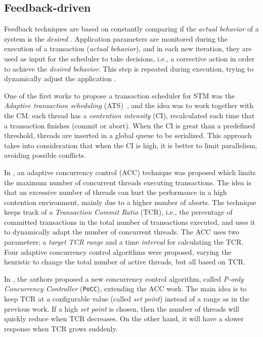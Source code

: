 \subsection{Feedback-driven}\label{sec:feedback}

Feedback techniques are based on constantly comparing if the \emph{actual behavior} of a system is the \emph{desired} \cite{Janert:2013}. Application parameters are monitored during the execution of a transaction (\emph{actual behavior}), and in each new iteration, they are used as input for the scheduler to take decisions, i.e., a corrective action in order to achieve the \emph{desired behavior}. This step is repeated during execution, trying to dynamically adjust the application \cite{Sanzo:2017}.

One of the first works to propose a transaction scheduler for  STM was the \textit{Adaptive transaction scheduling} (ATS)~\cite{Yoo:2008}, and the idea was to work together with the CM: each thread has a \emph{contention intensity} (CI), recalculated each time that a transaction finishes (commit or abort). When the CI is great than a predefined threshold, threads are inserted in a global queue to be serialized. This approach takes into consideration that when the CI is high, it is better to limit parallelism, avoiding possible conflicts. 

In , an adaptive concurrency control (ACC) technique was proposed which limits the maximum number of concurrent threads executing transactions. The idea is that an excessive number of threads can hurt the performance in a high contention environment, mainly due to a higher number of aborts. The technique keeps track of a \emph{Transaction Commit Ratio} (TCR), i.e., the percentage of committed transactions in the total number of transactions executed, and uses it to dynamically adapt the number of concurrent threads. The ACC uses two parameters: a \emph{target TCR range} and a time \emph{interval} for calculating the TCR. Four adaptive concurrency control algorithms were proposed, varying the heuristic to change the total number of active threads, but all based on TCR. 

In , the authors proposed a new concurrency control algorithm, called \emph{P-only Concurrency Controller} (\texttt{PoCC}), extending the ACC work. The main idea is to keep TCR at a configurable value (called \emph{set point}) instead of a range as in the previous work. If a high \emph{set point} is chosen, then the number of threads will quickly reduce when TCR decreases. On the other hand, it will have a slower response when TCR grows suddenly. 

